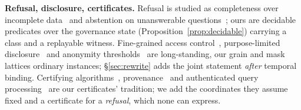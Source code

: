 \smallskip\noindent{}\textbf{Refusal, disclosure, certificates.} Refusal is studied
as completeness over incomplete data~\cite{completeness} and abstention on
unanswerable questions~\cite{ehrsql}; ours are decidable predicates over the
governance state (Proposition~\ref{prop:decidable}) carrying a class and a
replayable witness. Fine-grained access control~\cite{finegrained},
purpose-limited disclosure~\cite{hippocratic} and anonymity
thresholds~\cite{kanon,ldiversity} are long-standing, our grain and mask
lattices ordinary instances; \S\ref{sec:rewrite} adds the joint statement
\emph{after} temporal binding. Certifying
algorithms~\cite{certifying}, provenance~\cite{semirings,provsurvey} and
authenticated query processing~\cite{authindex,vsql} are our certificates'
tradition; we add the coordinates they assume fixed and a certificate for
a \emph{refusal}, which none can express.
